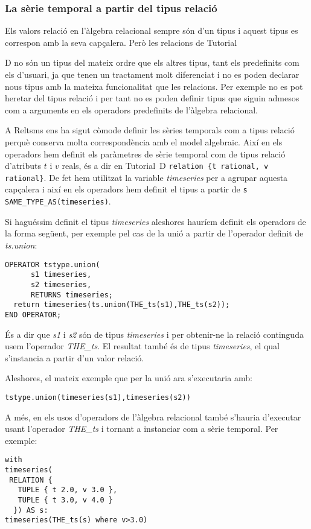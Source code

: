 \subsubsection{La sèrie temporal a partir del tipus relació}



Els valors relació en l'àlgebra relacional sempre són d'un tipus i
aquest tipus es correspon amb la seva capçalera. Però les relacions de
Tutorial{D no són un tipus del mateix ordre que els altres tipus, tant
  els predefinits com els d'usuari, ja que tenen un tractament molt
  diferenciat i no es poden declarar nous tipus amb la mateixa
  funcionalitat que les relacions.  Per exemple no es pot heretar del
  tipus relació i per tant no es poden definir tipus que siguin
  admesos com a arguments en els operadors predefinits de l'àlgebra
  relacional.


A Reltsms ens ha sigut còmode definir les sèries temporals com a tipus
relació perquè conserva molta correspondència amb el model algebraic.
Així en els operadors hem definit els paràmetres de sèrie temporal com
de tipus relació d'atributs $t$ i $v$ reals, és a dir en Tutorial~D %
\lstinline[style=tutorialD]+relation {t rational, v rational}+. %
De fet hem utilitzat la variable \emph{timeseries} per a agrupar
aquesta capçalera i així en els operadors hem definit el tipus a
partir de %
\lstinline[style=tutorialD]+s SAME_TYPE_AS(timeseries)+.%


Si haguéssim definit el tipus \emph{timeseries} aleshores hauríem
definit els operadors de la forma següent, per exemple pel cas de la
unió a partir de l'operador definit de \emph{ts.union}:
\begin{lstlisting}[style=tutorialD]
OPERATOR tstype.union(
      s1 timeseries, 
      s2 timeseries, 
      RETURNS timeseries;
  return timeseries(ts.union(THE_ts(s1),THE_ts(s2));
END OPERATOR;
\end{lstlisting}

És a dir que \emph{s1} i \emph{s2} són de tipus \emph{timeseries} i
per obtenir-ne la relació continguda usem l'operador \emph{THE\_ts}. El
resultat també és de tipus \emph{timeseries}, el qual s'instancia a
partir d'un valor relació.

Aleshores, el mateix exemple que per la unió ara s'executaria amb:
\begin{lstlisting}[style=tutorialD]
tstype.union(timeseries(s1),timeseries(s2))
\end{lstlisting}

A més, en els usos d'operadors de l'àlgebra relacional també s'hauria
d'executar usant l'operador \emph{THE\_ts} i tornant a instanciar com
a sèrie temporal. Per exemple:
\begin{lstlisting}[style=tutorialD]
with
timeseries(
 RELATION {
   TUPLE { t 2.0, v 3.0 },
   TUPLE { t 3.0, v 4.0 }
  }) AS s:
timeseries(THE_ts(s) where v>3.0)
\end{lstlisting}

}
